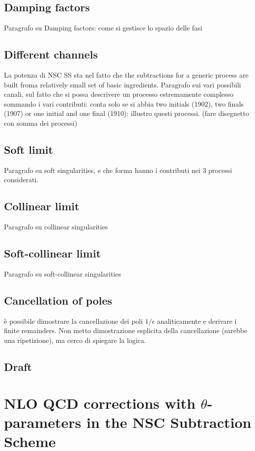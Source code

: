\documentclass[a4paper, 12pt]{book}
\begin{document}
\section{Damping factors}
Paragrafo su Damping factors: come si gestisce lo spazio delle fasi \\
\section{Different channels}
La potenza di NSC SS sta nel fatto che the subtractions for a generic process are built froma  relatively small set of basic ingredients. Paragrafo sui vari possibili canali, sul fatto che si possa descrivere un processo estremamente complesso sommando i vari contributi: conta solo se si abbia two initials (1902), two finals (1907) or one initial and one final (1910): illustro questi processi. (fare disegnetto con somma dei processi) \\
\section{Soft limit}
Paragrafo su soft singularities, e che forma hanno i contributi nei 3 processi considerati. \\
\section{Collinear limit}
Paragrafo su collinear singularities \\
\section{Soft-collinear limit}
Paragrafo su soft-collinear singularities \\
\section{Cancellation of poles}
è possibile dimostrare la cancellazione dei poli $1/\epsilon$ analiticamente e derivare i finite remainders. Non metto dimostrazione esplicita della cancellazione (sarebbe una ripetizione), ma cerco di spiegare la logica. 

\section{Draft}

\clearpage

\chapter{NLO QCD corrections with $\theta$-parameters in the NSC Subtraction Scheme}
\label{NSC-SS-parameters}
\end{document}
